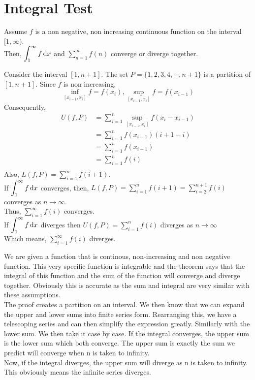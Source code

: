 \documentclass[12pt]{article}
\begin{document}
\section{Integral Test}
\begin{theo}{}
Assume \(f\) is a non negative, non increasing continuous function on the interval \([1, \infty)\).\\
Then, \(\displaystyle\int_{1}^\infty f \,\mathrm{d} x\) and \(\displaystyle\sum_{n=1}^\infty f(n)\) converge or diverge together.\\     
\end{theo}
\newpage
\begin{prf}{}
Consider the interval \([1, n+1]\). The set \(P = \{1, 2, 3, 4, \cdots , n+1\}\) is a partition of \([1, n+1]\). Since \(f\) is non increasing,
\[\displaystyle\inf_{[x_{i-1}, x_i]} f = f(x_i), \sup_{[x_{i-1},x_i]} f = f(x_{i-1})\]
Consequently,
\begin{align*}
    U(f,P) &= \displaystyle\sum_{i=1}^n \sup_{[x_{i-1}, x_i]} f(x_i - x_{i-1})\\
    &= \displaystyle\sum_{i=1}^n f(x_{i-1})(i+1-i)\\
    &= \displaystyle\sum_{i=1}^n f(x_{i-1})\\
    &= \displaystyle\sum_{i=1}^n f(i)\\
\end{align*}
Also, \(L(f,P) = \displaystyle\sum_{i=1}^n f(i+1)\).\\
If \(\displaystyle\int_1^\infty f \,\mathrm{d} x\) converges, then, \(L(f, P) = \displaystyle\sum_{i=1}^n f(i+1) = \displaystyle\sum_{i=2}^{n+1}f(i)\) converges as \(n\to\infty\).\\
Thus, \(\displaystyle\sum_{i=1}^\infty f(i)\) converges.\\
If \(\displaystyle\int_1^\infty f \,\mathrm{d} x\) diverges then \(U(f,P) = \displaystyle\sum_{i=1}^n f(i)\) diverges as \(n\to\infty\)\\
Which means, \(\displaystyle\sum_{i=1}^\infty f(i)\) diverges.  
\end{prf}\newpage
\begin{explanation}{}
    We are given a function that is continous, non-increasing and non negative function. This very specific function is integrable and the theorem says that the integral of this function and the sum of the function will converge and diverge together. Obviously this is accurate as the sum and integral are very similar with these assumptions.\\
The proof creates a partition on an interval. We then know that we can expand the upper and lower sums into finite series form.  Rearranging this, we have a telescoping series and can then simplify the expression greatly. Similarly with the lower sum. We then take it case by case. If the integral converges, the upper sum is the lower sum which both converge. The upper sum is exactly the sum we predict will converge when n is taken to infinity.\\
Now, if the integral diverges, the upper sum will diverge as n is taken to infinity. This obviously means the infinite series diverges.\\
\end{explanation}
\end{document}
